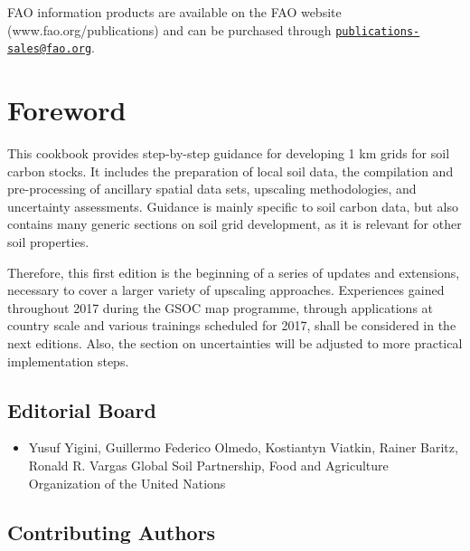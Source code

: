 \documentclass[10pt,b5paper,]{book}
\providecommand{\tightlist}{%
  \setlength{\itemsep}{0pt}\setlength{\parskip}{0pt}}
\theoremstyle{definition}
\theoremstyle{definition}
\theoremstyle{definition}
\theoremstyle{remark}
\begin{document}
FAO information products are available on the FAO website
(www.fao.org/publications) and can be purchased through
\href{mailto:publications-sales@fao.org}{\nolinkurl{publications-sales@fao.org}}.

\hypertarget{foreword}{%
\chapter*{Foreword}\label{foreword}}

This cookbook provides step-by-step guidance for developing 1 km grids
for soil carbon stocks. It includes the preparation of local soil data,
the compilation and pre-processing of ancillary spatial data sets,
upscaling methodologies, and uncertainty assessments. Guidance is mainly
specific to soil carbon data, but also contains many generic sections on
soil grid development, as it is relevant for other soil properties.

Therefore, this first edition is the beginning of a series of updates
and extensions, necessary to cover a larger variety of upscaling
approaches. Experiences gained throughout 2017 during the GSOC map
programme, through applications at country scale and various trainings
scheduled for 2017, shall be considered in the next editions. Also, the
section on uncertainties will be adjusted to more practical
implementation steps.

\clearpage

\hypertarget{editorial-board}{%
\section*{Editorial Board}\label{editorial-board}}

\begin{itemize}
\tightlist
\item
  Yusuf Yigini, Guillermo Federico Olmedo, Kostiantyn Viatkin, Rainer
  Baritz, Ronald R. Vargas Global Soil Partnership, Food and Agriculture
  Organization of the United Nations
\end{itemize}

\hypertarget{contributing-authors}{%
\section*{Contributing Authors}\label{contributing-authors}}
\end{document}
